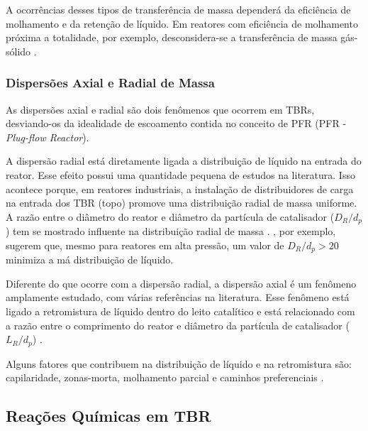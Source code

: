 A ocorrências desses tipos de transferência de massa dependerá da eficiência de
molhamento e da retenção de líquido. Em reatores com eficiência de molhamento
próxima a totalidade, por exemplo, desconsidera-se a transferência de massa
gás-sólido \cite{Ranade2011}.

\subsubsection{Dispersões Axial e Radial de Massa}
\label{sec:dispersoes}

As dispersões axial e radial são dois fenômenos que ocorrem em TBRs,
desviando-os da idealidade de escoamento contida no conceito de PFR (PFR -
\emph{Plug-flow Reactor}).


A dispersão radial está diretamente ligada a distribuição de líquido na entrada
do reator. Esse efeito possui uma quantidade pequena de estudos na literatura.
Isso acontece porque, em reatores industriais, a instalação de distribuidores de
carga na entrada dos TBR (topo) promove uma distribuição radial de massa
uniforme. A razão entre o diâmetro do reator e diâmetro da partícula de
catalisador ($D_R/d_p$) tem se mostrado influente na distribuição radial de
massa \cite{Saroha1998}. , por exemplo, sugerem que,
mesmo para reatores em alta pressão, um valor de $D_R/d_p > 20$ minimiza a má
distribuição de líquido.

Diferente do que ocorre com a dispersão radial, a dispersão axial é um fenômeno
amplamente estudado, com várias referências na literatura. Esse fenômeno está
ligado a retromistura de líquido dentro do leito catalítico e está relacionado
com a razão entre o comprimento do reator e diâmetro da partícula de catalisador
($L_R/d_p$) \cite{Ancheyta2011}.


Alguns fatores que contribuem na distribuição de líquido e na retromistura são:
capilaridade, zonas-morta, molhamento parcial e caminhos preferenciais
\cite{Ranade2011}.

\subsection{Reações Químicas em TBR} \label{sec:reacoestbr}
 
